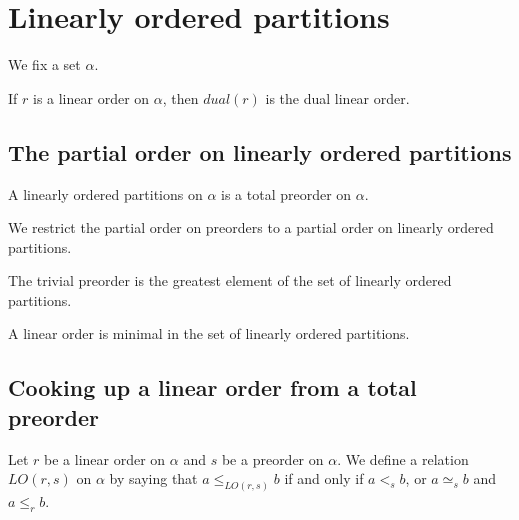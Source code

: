 \section{Linearly ordered partitions}

We fix a set $\alpha$.

\begin{subdefi}[dual]
If $r$ is a linear order on $\alpha$, then $dual(r)$ is the dual linear order.

\end{subdefi}


\subsection{The partial order on linearly ordered partitions}

\begin{subdefi}[LinearOrderedPartitions]
A linearly ordered partitions on $\alpha$ is a total preorder on $\alpha$.

\end{subdefi}

\begin{subdefi}
We restrict the partial order on preorders to a partial order on linearly ordered partitions.

\end{subdefi}

\begin{sublemma}
The trivial preorder is the greatest element of the set of linearly ordered partitions.

\end{sublemma}

\begin{sublemma}
A linear order is minimal in the set of linearly ordered partitions.

\end{sublemma}


\subsection{Cooking up a linear order from a total preorder}

\begin{subdefi}
Let $r$ be a linear order on $\alpha$ and $s$ be a preorder on $\alpha$. We define a relation
$LO(r,s)$ on $\alpha$ by saying that $a\le_{LO(r,s)}b$ if and only if $a<_s b$, or $a\simeq_s b$ and
$a\le_r b$. 

\end{subdefi}

